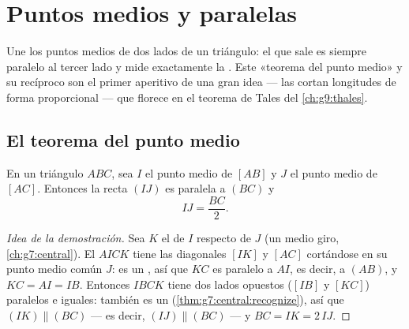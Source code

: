 \chapter{Puntos medios y paralelas}\label{ch:g8:midpoints}

Une los puntos medios de dos lados de un triángulo: el  que sale es
siempre paralelo al tercer lado y mide exactamente la . Este
«teorema del punto medio» y su recíproco son el primer aperitivo de una gran
idea --- las  cortan longitudes de forma proporcional --- que florece en el
teorema de Tales del \cref{ch:g9:thales}.

\section{El teorema del punto medio}

\begin{theorem}\label{thm:g8:midpoints:direct}
En un triángulo $ABC$, sea $I$ el punto medio de $[AB]$ y $J$ el
punto medio de $[AC]$. Entonces la recta $(IJ)$ es paralela a $(BC)$ y
\[
IJ = \frac{BC}{2} .
\]
\end{theorem}

\begin{proof}[Idea de la demostración]
Sea $K$ el  de $I$ respecto de $J$ (un medio giro,
\cref{ch:g7:central}). El  $AICK$ tiene las diagonales $[IK]$
y $[AC]$ cortándose en su punto medio común $J$: es un
, así que $KC$ es paralelo a $AI$, es decir, a $(AB)$, y
$KC = AI = IB$. Entonces $IBCK$ tiene dos lados opuestos ($[IB]$ y
$[KC]$) paralelos e iguales: también es un 
(\cref{thm:g7:central:recognize}), así que $(IK) \parallel (BC)$ ---
es decir, $(IJ) \parallel (BC)$ --- y $BC = IK = 2\,IJ$.
\end{proof}

